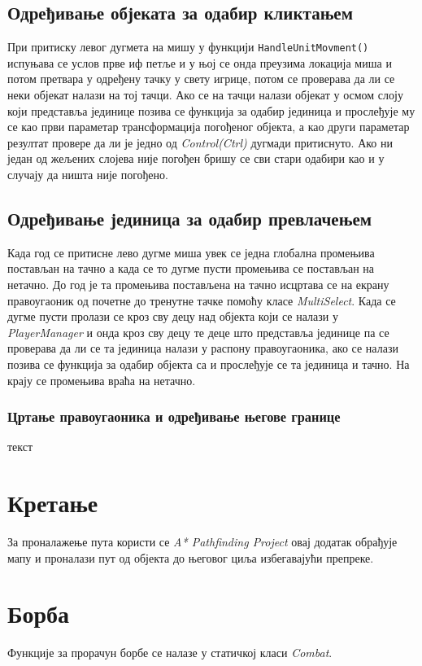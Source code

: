\documentclass[11pt,a4paper]{report}
\begin{document}
\subsection{Одређивање објеката за одабир кликтањем}
При притиску левог дугмета на мишу у функцији \texttt{HandleUnitMovment()} испуњава се услов прве иф петље и у њој се онда преузима локација миша и потом претвара у  одређену тачку у свету игрице, потом се проверава да ли се неки објекат налази на тој тачци. Ако се на тачци налази објекат у осмом слоју који представља јединице позива се функција за одабир јединица и прослеђује му се као први параметар трансформација погођеног објекта, а као други параметар резултат провере да ли је једно од \emph{Control(Ctrl)} дугмади притиснуто. Ако ни један од жељених слојева није погођен бришу се сви стари одабири као и у случају да ништа није погођено. 

\subsection{Одређивање јединица за одабир превлачењем}
Када год се притисне лево дугме миша увек се једна глобална промењива постављан на тачно а када се то дугме пусти промењива се постављан на нетачно. До год је та промењива постављена на тачно исцртава се на екрану правоугаоник од почетне до тренутне тачке помоћу класе \emph{MultiSelect}. Када се дугме пусти пролази се кроз сву децу над објекта који се налази у \emph{PlayerManager} и онда кроз сву децу те деце што представља јединице па се проверава да ли се та јединица налази у распону правоугаоника, ако се налази позива се функција за одабир објекта са и прослеђује се та јединица и тачно. На крају се промењива враћа на нетачно.

\subsubsection{Цртање правоугаоника и одређивање његове границе}
текст 

\section{Кретање}
За проналажење пута користи се \emph{A* Pathfinding Project} овај додатак обрађује мапу и проналази пут од објекта до његовог циља избегавајући препреке.

\section{Борба}
Функције за прорачун борбе се налазе у статичкој класи \emph{Combat}.
\end{document}
